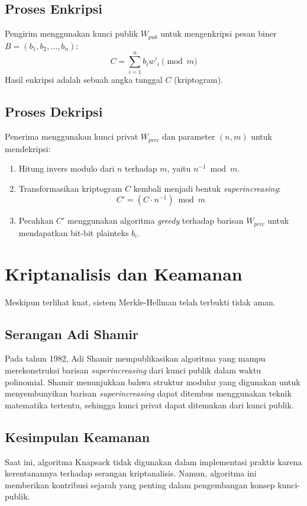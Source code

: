 \documentclass[../main.tex]{subfiles}
\begin{document}
\subsection{Proses Enkripsi}
Pengirim menggunakan kunci publik $W_{pub}$ untuk mengenkripsi pesan biner $B = (b_1, b_2, \dots, b_n)$:
\[ C = \sum_{i=1}^{n} b_i w'_i \pmod{m} \]
Hasil enkripsi adalah sebuah angka tunggal $C$ (kriptogram).

\subsection{Proses Dekripsi}
Penerima menggunakan kunci privat $W_{priv}$ dan parameter $(n, m)$ untuk mendekripsi:
\begin{enumerate}
    \item Hitung invers modulo dari $n$ terhadap $m$, yaitu $n^{-1} \bmod m$.
    \item Transformasikan kriptogram $C$ kembali menjadi bentuk \textit{superincreasing}:
    \[ C' = (C \cdot n^{-1}) \bmod m \]
    \item Pecahkan $C'$ menggunakan algoritma \textit{greedy} terhadap barisan $W_{priv}$ untuk mendapatkan bit-bit plainteks $b_i$.
\end{enumerate}

\section{Kriptanalisis dan Keamanan}
Meskipun terlihat kuat, sistem Merkle-Hellman telah terbukti tidak aman.

\subsection{Serangan Adi Shamir}
Pada tahun 1982, Adi Shamir mempublikasikan algoritma yang mampu merekonstruksi barisan \textit{superincreasing} dari kunci publik dalam waktu polinomial. Shamir menunjukkan bahwa struktur modular yang digunakan untuk menyembunyikan barisan \textit{superincreasing} dapat ditembus menggunakan teknik matematika tertentu, sehingga kunci privat dapat ditemukan dari kunci publik.

\subsection{Kesimpulan Keamanan}
Saat ini, algoritma Knapsack tidak digunakan dalam implementasi praktis karena kerentanannya terhadap serangan kriptanalisis. Namun, algoritma ini memberikan kontribusi sejarah yang penting dalam pengembangan konsep kunci-publik.
\end{document}
